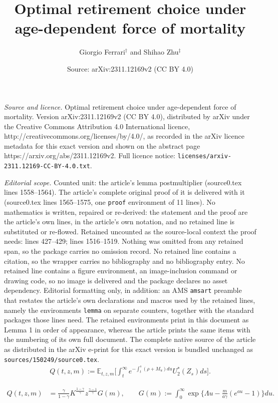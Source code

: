 \documentclass[10pt,a4paper]{amsart}
\title{Optimal retirement choice under age-dependent force of mortality}
\author{Giorgio Ferrari$^\dagger$ \quad and \quad Shihao Zhu$^\ddagger$}
\date{Source: arXiv:2311.12169v2 (CC BY 4.0)}
\begin{document}
\maketitle

\noindent\emph{Source and licence.} Optimal retirement choice under age-dependent force of mortality. Version arXiv:2311.12169v2 (CC BY 4.0), distributed by arXiv under the Creative Commons Attribution 4.0 International licence, http://creativecommons.org/licenses/by/4.0/, as recorded in the arXiv licence metadata for this exact version and shown on the abstract page https://arxiv.org/abs/2311.12169v2. Full licence notice: \texttt{licenses/arxiv-2311.12169-CC-BY-4.0.txt}.\par\smallskip

\noindent\textit{Editorial scope.} Counted unit: the article's lemma postmultiplier (source0.tex lines 1558--1564). The article's complete original proof of it is delivered with it (source0.tex lines 1565--1575, one \texttt{proof} environment of 11 lines). No mathematics is written, repaired or re-derived: the statement and the proof are the article's own lines, in the article's own notation, and no retained line is substituted or re-flowed.  Retained uncounted as the source-local context the proof needs: lines 427--429; lines 1516--1519.  Nothing was omitted from any retained span, so the package carries no omission record.  No retained line contains a citation, so the wrapper carries no bibliography and no bibliography entry.  No retained line contains a figure environment, an image-inclusion command or drawing code, so no image is delivered and the package declares no asset dependency.  Editorial formatting only, in addition: an AMS \texttt{amsart} preamble that restates the article's own declarations and macros used by the retained lines, namely the environments \texttt{lemma} on separate counters, together with the standard packages those lines need.  The retained environments print in this document as Lemma 1 in order of appearance, whereas the article prints the same items with the numbering of its own full document.  The complete native source of the article as distributed in the arXiv e-print for this exact version is bundled unchanged as \texttt{sources/150249/source0.tex}.
\begin{align}\label{3-8}
Q(t,z,m):=  \mathbb{E}_{t,z,m}\bigg[    \int_t^{\infty }  e^{-\int^s_t (\rho+ M_u) du} U_2^\ast(Z_s) ds  \bigg].
\end{align}

\begin{align}\label{w}
Q(t,z,m)&=\frac{\gamma}{1-\gamma}K^{\frac{1-\gamma}{\gamma}}z^{\frac{\gamma-1}{\gamma}}G(m),\qquad
G(m):=\int_0^\infty\exp\bigg\{\Lambda u-\frac{m}{a\gamma}(e^{au}-1)\bigg\}du.
\end{align}
\end{document}
